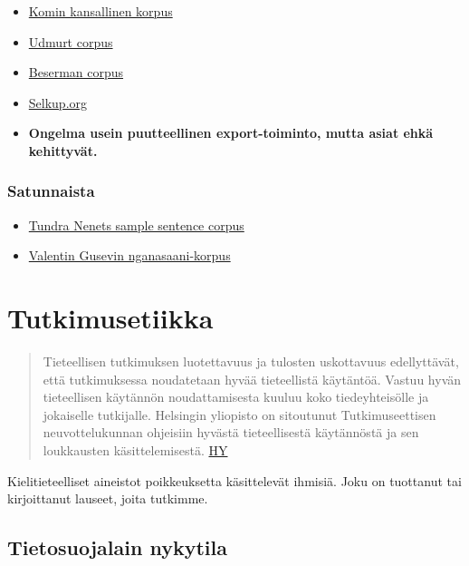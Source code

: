 \documentclass[]{book}
\providecommand{\tightlist}{%
  \setlength{\itemsep}{0pt}\setlength{\parskip}{0pt}}
\begin{document}
\begin{itemize}
\item
  \href{http://komicorpora.ru}{Komin kansallinen korpus}
\item
  \href{http://web-corpora.net/UdmurtCorpus/search/}{Udmurt corpus}
\item
  \href{http://beserman.ru/corpus/search/}{Beserman corpus}
\item
  \href{http://selkup.org/}{Selkup.org}
\item
  \textbf{Ongelma usein puutteellinen export-toiminto, mutta asiat ehkä
  kehittyvät.}
\end{itemize}

\hypertarget{satunnaista}{%
\subsection{Satunnaista}\label{satunnaista}}

\begin{itemize}
\tightlist
\item
  \href{http://www.helsinki.fi/~tasalmin/tn_corpus.html}{Tundra Nenets
  sample sentence corpus}
\item
  \href{http://www.iling-ran.ru/gusev/Nganasan/}{Valentin Gusevin
  nganasaani-korpus}
\end{itemize}

\hypertarget{tutkimusetiikka-1}{%
\chapter{Tutkimusetiikka}\label{tutkimusetiikka-1}}

\begin{quote}
Tieteellisen tutkimuksen luotettavuus ja tulosten uskottavuus
edellyttävät, että tutkimuksessa noudatetaan hyvää tieteellistä
käytäntöä. Vastuu hyvän tieteellisen käytännön noudattamisesta kuuluu
koko tiedeyhteisölle ja jokaiselle tutkijalle. Helsingin yliopisto on
sitoutunut Tutkimuseettisen neuvottelukunnan ohjeisiin hyvästä
tieteellisestä käytännöstä ja sen loukkausten käsittelemisestä.
\href{https://www.helsinki.fi/fi/tutkimus/tutkimusymparisto/tutkimusetiikka}{HY}
\end{quote}

Kielitieteelliset aineistot poikkeuksetta käsittelevät ihmisiä. Joku on
tuottanut tai kirjoittanut lauseet, joita tutkimme.

\hypertarget{tietosuojalain-nykytila}{%
\section{Tietosuojalain nykytila}\label{tietosuojalain-nykytila}}
\end{document}
